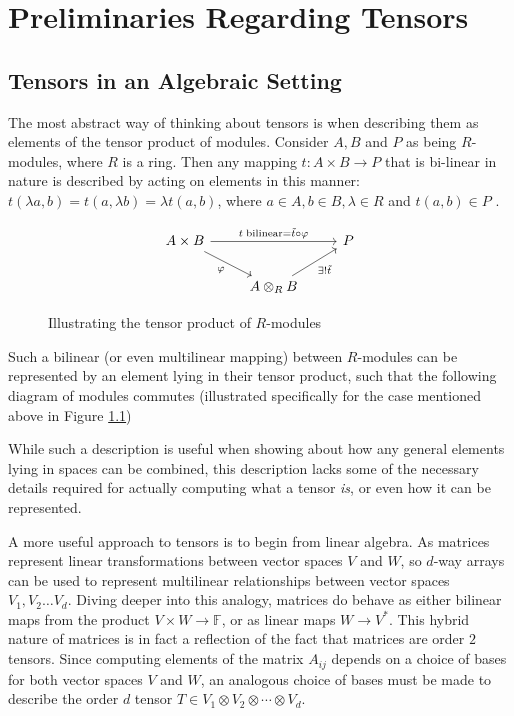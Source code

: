 \documentclass[12pt,a4paper,oneside]{book}
\theoremstyle{definition}
\begin{document}
\chapter{Preliminaries Regarding Tensors}\label{chapter:preliminaries}

\section{Tensors in an Algebraic Setting}\label{section:tensoralgebra}
The most abstract way of thinking about tensors is when describing them as elements of the tensor product of modules. Consider $A, B$ and $P$ as being $R$-modules, where $R$ is a ring. Then any mapping $t: A \times B \to P$ that is bi-linear in nature is described by acting on elements in this manner: $t(\lambda a, b) = t(a, \lambda b) = \lambda t(a, b)$, where $a \in A, b \in B, \lambda \in R$ and $t(a,b) \in P$ . 

\begin{figure}[h]
    \[\begin{tikzcd}
        {A \times B} && P \\
        & {A \otimes_R B}
        \arrow["{t\; \text{bilinear} = \tilde{t} \circ \varphi}", from=1-1, to=1-3]
        \arrow["\varphi"', from=1-1, to=2-2]
        \arrow["{\exists !\tilde{t}}"', from=2-2, to=1-3]
    \end{tikzcd}\]
    \caption{Illustrating the tensor product of $R$-modules}\label{fig:tensorcommutativediagram}
\end{figure}

Such a bilinear (or even multilinear mapping) between $R$-modules can be represented by an element lying in their tensor product, such that the following diagram of modules commutes \cite{vakil_rising_2025} (illustrated specifically for the case mentioned above in Figure \cref{fig:tensorcommutativediagram})

While such a description is useful when showing about how any general elements lying in spaces can be combined, this description lacks some of the necessary details required for actually computing what a tensor \textit{is}, or even how it can be represented.

A more useful approach to tensors is to begin from linear algebra. As matrices represent linear transformations between vector spaces $V$ and $W$, so $d$-way arrays can be used to represent multilinear relationships between vector spaces $V_1, V_2 \ldots V_d$. Diving deeper into this analogy, matrices do behave as either bilinear maps from the product $V \times W \to \mathbb{F}$, or as linear maps $W \to V^*$. This hybrid nature of matrices is in fact a reflection of the fact that matrices are order $2$ tensors. Since computing elements of the matrix $A_{ij}$ depends on a choice of bases for both vector spaces $V$ and $W$, an analogous choice of bases must be made to describe the order $d$ tensor $T \in V_1 \otimes V_2 \otimes \cdots \otimes V_d$. 
\end{document}

